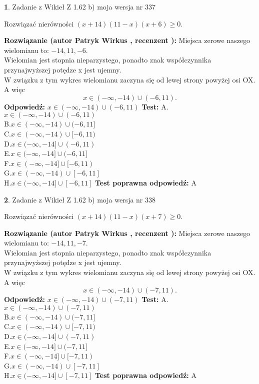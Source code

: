 \documentclass[12pt, a4paper]{article}
\theoremstyle{definition} %
\newtheorem{zad}{}
\newcommand{\zadStart}[1]{\begin{zad}#1\newline}
\newcommand{\zadStop}{\end{zad}}
\newcommand{\rozwStart}[2]{\noindent \textbf{Rozwiązanie (autor #1 , recenzent #2): }\newline}
\newcommand{\rozwStop}{\newline}
\newcommand{\odpStart}{\noindent \textbf{Odpowiedź:}\newline}
\newcommand{\odpStop}{\newline}
\newcommand{\testStart}{\noindent \textbf{Test:}\newline}
\newcommand{\testStop}{\newline}
\newcommand{\kluczStart}{\noindent \textbf{Test poprawna odpowiedź:}\newline}
\newcommand{\kluczStop}{\newline}
\begin{document}
\zadStart{Zadanie z Wikieł Z 1.62 b) moja wersja nr 337}

Rozwiązać nierówności $(x+14)(11-x)(x+6)\ge0$.
\zadStop
\rozwStart{Patryk Wirkus}{}
Miejsca zerowe naszego wielomianu to: $-14, 11, -6$.\\
Wielomian jest stopnia nieparzystego, ponadto znak współczynnika przy\linebreak najwyższej potędze x jest ujemny.\\ W związku z tym wykres wielomianu zaczyna się od lewej strony powyżej osi OX. A więc $$x \in (-\infty,-14) \cup (-6,11).$$
\rozwStop
\odpStart
$x \in (-\infty,-14) \cup (-6,11)$
\odpStop
\testStart
A.$x \in (-\infty,-14) \cup (-6,11)$\\
B.$x \in (-\infty,-14) \cup (-6,11]$\\
C.$x \in (-\infty,-14) \cup [-6,11)$\\
D.$x \in (-\infty,-14] \cup (-6,11)$\\
E.$x \in (-\infty,-14] \cup (-6,11]$\\
F.$x \in (-\infty,-14] \cup [-6,11)$\\
G.$x \in (-\infty,-14) \cup [-6,11]$\\
H.$x \in (-\infty,-14] \cup [-6,11]$
\testStop
\kluczStart
A
\kluczStop



\zadStart{Zadanie z Wikieł Z 1.62 b) moja wersja nr 338}

Rozwiązać nierówności $(x+14)(11-x)(x+7)\ge0$.
\zadStop
\rozwStart{Patryk Wirkus}{}
Miejsca zerowe naszego wielomianu to: $-14, 11, -7$.\\
Wielomian jest stopnia nieparzystego, ponadto znak współczynnika przy\linebreak najwyższej potędze x jest ujemny.\\ W związku z tym wykres wielomianu zaczyna się od lewej strony powyżej osi OX. A więc $$x \in (-\infty,-14) \cup (-7,11).$$
\rozwStop
\odpStart
$x \in (-\infty,-14) \cup (-7,11)$
\odpStop
\testStart
A.$x \in (-\infty,-14) \cup (-7,11)$\\
B.$x \in (-\infty,-14) \cup (-7,11]$\\
C.$x \in (-\infty,-14) \cup [-7,11)$\\
D.$x \in (-\infty,-14] \cup (-7,11)$\\
E.$x \in (-\infty,-14] \cup (-7,11]$\\
F.$x \in (-\infty,-14] \cup [-7,11)$\\
G.$x \in (-\infty,-14) \cup [-7,11]$\\
H.$x \in (-\infty,-14] \cup [-7,11]$
\testStop
\kluczStart
A
\kluczStop
\end{document}
